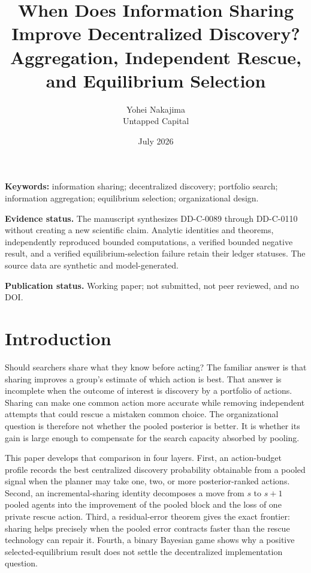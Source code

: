 \documentclass[12pt]{article}
\title{\textbf{When Does Information Sharing Improve Decentralized Discovery?}\\[0.35em]\large Aggregation, Independent Rescue, and Equilibrium Selection}
\author{Yohei Nakajima\\Untapped Capital}
\date{July 2026}
\newcommand{\Evidence}[1]{\par\noindent\textbf{Evidence status.} #1\par}
\theoremstyle{definition}
\begin{document}
\maketitle


\noindent\textbf{Keywords:} information sharing; decentralized discovery;
portfolio search; information aggregation; equilibrium selection; organizational design.

\Evidence{The manuscript synthesizes DD-C-0089 through DD-C-0110 without
creating a new scientific claim. Analytic identities and theorems, independently
reproduced bounded computations, a verified bounded negative result, and a
verified equilibrium-selection failure retain their ledger statuses. The source
data are synthetic and model-generated.}
\noindent\textbf{Publication status.} Working paper; not submitted, not peer
reviewed, and no DOI.

\section{Introduction}

Should searchers share what they know before acting? The familiar answer is that
sharing improves a group's estimate of which action is best. That answer is
incomplete when the outcome of interest is discovery by a portfolio of actions.
Sharing can make one common action more accurate while removing independent
attempts that could rescue a mistaken common choice. The organizational question
is therefore not whether the pooled posterior is better. It is whether its gain
is large enough to compensate for the search capacity absorbed by pooling.

This paper develops that comparison in four layers. First, an action-budget
profile records the best centralized discovery probability obtainable from a
pooled signal when the planner may take one, two, or more posterior-ranked
actions. Second, an incremental-sharing identity decomposes a move from $s$ to
$s+1$ pooled agents into the improvement of the pooled block and the loss of one
private rescue action. Third, a residual-error theorem gives the exact frontier:
sharing helps precisely when the pooled error contracts faster than the rescue
technology can repair it. Fourth, a binary Bayesian game shows why a positive
selected-equilibrium result does not settle the decentralized implementation
question.
\end{document}
